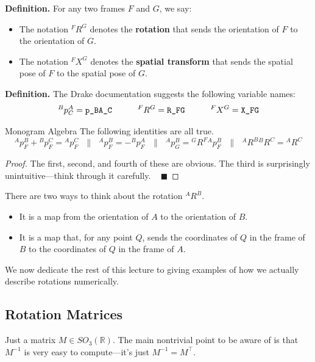 \textbf{Definition.}
For any two frames $F$ and $G$, we say:
\begin{itemize}
    \item The notation $^FR^G$ denotes
    the \textbf{rotation} that sends the orientation of $F$
    to the orientation of $G$.
    \item The notation $^FX^G$ denotes
    the \textbf{spatial transform} that sends the spatial pose of $F$
    to the spatial pose of $G$.
\end{itemize}

\textbf{Definition.}
The Drake documentation suggests the following variable names:
\[ ^Bp^A_C = \verb|p_BA_C|
~~~~~~~~~
^FR^G = \verb|R_FG|
~~~~~~~~~
^FX^G = \verb|X_FG| \]

\begin{theorem}{Monogram Algebra}
    The following identities are all true.
    \[
    {}^Ap^B_F + {}^Bp^C_F = {}^Ap^C_F
    ~~~ \parallel ~~~
    {}^Ap^B_F = - {}^Bp^A_F
    ~~~ \parallel ~~~
    {}^Ap^B_G = {}^GR^F {}^Ap^B_F
    ~~~ \parallel ~~~
    {}^AR^B {}^BR^C = {}^AR^C
    \]
\end{theorem}

\begin{proof}
    The first, second, and fourth of these are obvious.
    The third is surprisingly unintuitive---think through it carefully.
    ~ $\blacksquare$
\end{proof}

\begin{remark}
    There are two ways to think about the rotation $^AR^B$.
    \begin{itemize}
        \item It is a map from the orientation of $A$
        to the orientation of $B$.
        \item It is a map that, for any point $Q$,
        sends the coordinates of $Q$ in the frame of $B$
        to the coordinates of $Q$ in the frame of $A$.
    \end{itemize}
\end{remark}

We now dedicate the rest of this lecture
to giving examples of how we actually describe rotations numerically.

\subsection{Rotation Matrices}

Just a matrix $M \in SO_3(\mathbb{R})$.
The main nontrivial point to be aware of
is that $M^{-1}$ is very easy to compute---it's just $M^{-1} = M^{\top}$.

